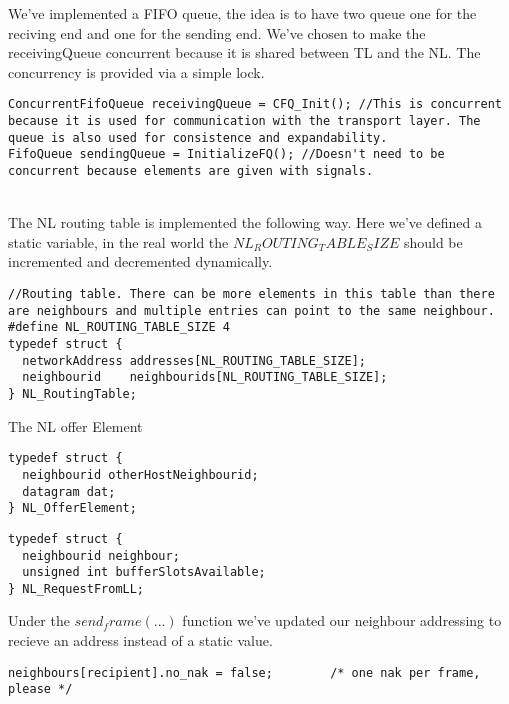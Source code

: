 We've implemented a FIFO queue, the idea is to have two queue one for the reciving end and one for the sending end.
We've chosen to make the receivingQueue concurrent because it is shared between TL and the NL.
The concurrency is provided via a simple lock.

\begin{lstlisting}
ConcurrentFifoQueue receivingQueue = CFQ_Init(); //This is concurrent because it is used for communication with the transport layer. The queue is also used for consistence and expandability.
FifoQueue sendingQueue = InitializeFQ(); //Doesn't need to be concurrent because elements are given with signals.
\end{lstlisting}

\\




The NL routing table is implemented the following way.
Here we've defined a static variable, in the real world the $NL_ROUTING_TABLE_SIZE$ should be incremented and decremented dynamically.
\begin{lstlisting}
//Routing table. There can be more elements in this table than there are neighbours and multiple entries can point to the same neighbour.
#define NL_ROUTING_TABLE_SIZE 4
typedef struct {
  networkAddress addresses[NL_ROUTING_TABLE_SIZE];
  neighbourid    neighbourids[NL_ROUTING_TABLE_SIZE];
} NL_RoutingTable;
\end{lstlisting}

\break


The NL offer Element
\begin{lstlisting}
typedef struct {
  neighbourid otherHostNeighbourid;
  datagram dat;
} NL_OfferElement;
\end{lstlisting}

\break

\begin{lstlisting}
typedef struct {
  neighbourid neighbour;
  unsigned int bufferSlotsAvailable;
} NL_RequestFromLL;

\end{lstlisting}



Under the $send_frame(...)$ function we've updated our neighbour addressing to recieve an address instead of a static value.
\begin{lstlisting}
neighbours[recipient].no_nak = false;        /* one nak per frame, please */
\end{lstlisting}














